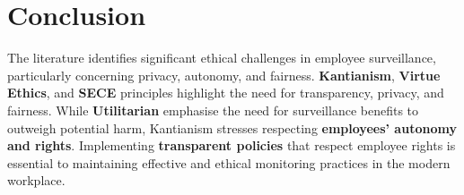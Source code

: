 \documentclass[a4paper, 11pt]{article}
\begin{document}
\section*{Conclusion}
The literature identifies significant ethical challenges in employee surveillance, particularly concerning privacy, autonomy, and fairness. \textbf{Kantianism}, \textbf{Virtue Ethics}, and \textbf{SECE} principles highlight the need for transparency, privacy, and fairness. While \textbf{Utilitarian} emphasise the need for surveillance benefits to outweigh potential harm, Kantianism stresses respecting \textbf{employees' autonomy and rights}. Implementing \textbf{transparent policies} that respect employee rights is essential to maintaining effective and ethical monitoring practices in the modern workplace.



\end{document}
